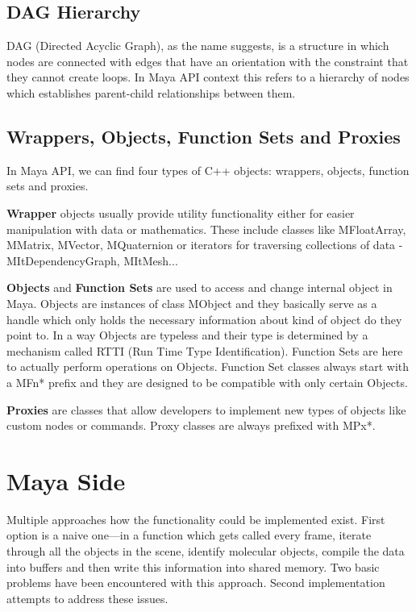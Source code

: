 \documentclass[
  digital, %
  table,   %
  nolof,     %
  nolot,     %
]{fithesis3}
\begin{document}
\subsection{DAG Hierarchy}
DAG (Directed Acyclic Graph), as the name suggests, is a structure in which nodes are connected with edges that have an orientation with the constraint that they cannot create loops. In Maya API context this refers to a hierarchy of nodes which establishes parent-child relationships between them.

\subsection{Wrappers, Objects, Function Sets and Proxies}
In Maya API, we can find four types of C++ objects: wrappers, objects, function sets and proxies.

\textbf{Wrapper} objects usually provide utility functionality either for easier manipulation with data or mathematics. These include classes like MFloatArray, MMatrix, MVector, MQuaternion or iterators for traversing collections of data - MItDependencyGraph, MItMesh...

\textbf{Objects} and \textbf{Function Sets} are used to access and change internal object in Maya. Objects are instances of class MObject and they basically serve as a handle which only holds the necessary information about kind of object do they point to. In a way Objects are typeless and their type is determined by a mechanism called RTTI (Run Time Type Identification). Function Sets are here to actually perform operations on Objects. Function Set classes always start with a MFn* prefix and they are designed to be compatible with only certain Objects.

\textbf{Proxies} are classes that allow developers to implement new types of objects like custom nodes or commands. Proxy classes are always prefixed with MPx*.

\section{Maya Side}
Multiple approaches how the functionality could be implemented exist. First option is a naive one—in a function which gets called every frame, iterate through all the objects in the scene, identify molecular objects, compile the data into buffers and then write this information into shared memory. Two basic problems have been encountered with this approach. Second implementation attempts to address these issues.
\end{document}
